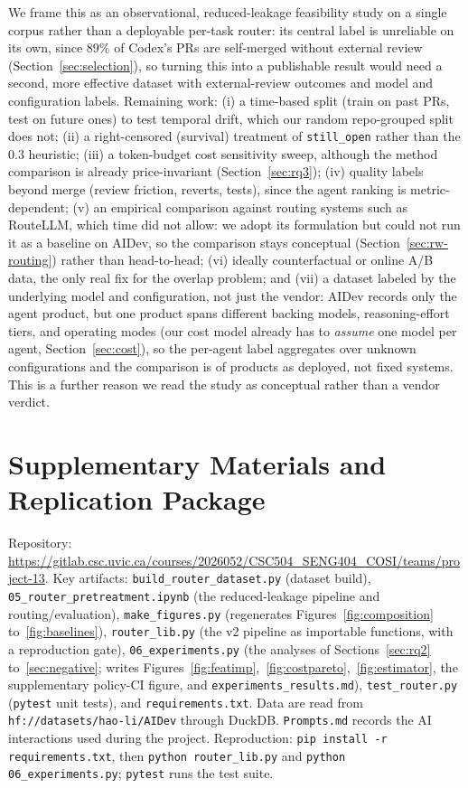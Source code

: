 \documentclass[sigconf,nonacm]{acmart}
\begin{document}
We frame this as an observational, reduced-leakage feasibility study on a single corpus rather than a deployable per-task router: its central label is unreliable on its own, since 89\% of Codex's PRs are self-merged without external review (Section~\ref{sec:selection}), so turning this into a publishable result would need a second, more effective dataset with external-review outcomes and model and configuration labels. Remaining work: (i) a time-based split (train on past PRs, test on future ones) to test temporal drift, which our random repo-grouped split does not; (ii) a right-censored (survival) treatment of \texttt{still\_open} rather than the 0.3 heuristic; (iii) a token-budget cost sensitivity sweep, although the method comparison is already price-invariant (Section~\ref{sec:rq3}); (iv) quality labels beyond merge (review friction, reverts, tests), since the agent ranking is metric-dependent; (v) an empirical comparison against routing systems such as RouteLLM, which time did not allow: we adopt its formulation but could not run it as a baseline on AIDev, so the comparison stays conceptual (Section~\ref{sec:rw-routing}) rather than head-to-head; (vi) ideally counterfactual or online A/B data, the only real fix for the overlap problem; and (vii) a dataset labeled by the underlying model and configuration, not just the vendor: AIDev records only the agent product, but one product spans different backing models, reasoning-effort tiers, and operating modes (our cost model already has to \emph{assume} one model per agent, Section~\ref{sec:cost}), so the per-agent label aggregates over unknown configurations and the comparison is of products as deployed, not fixed systems. This is a further reason we read the study as conceptual rather than a vendor verdict.




\appendix

\section{Supplementary Materials and Replication Package}

\sloppy
Repository: \url{https://gitlab.csc.uvic.ca/courses/2026052/CSC504_SENG404_COSI/teams/project-13}. Key artifacts: \texttt{build\_router\_dataset.py} (dataset build), \texttt{05\_router\_pretreatment.ipynb} (the reduced-leakage pipeline and routing/evaluation), \texttt{make\_figures.py} (regenerates Figures~\ref{fig:composition} to~\ref{fig:baselines}), \texttt{router\_lib.py} (the v2 pipeline as importable functions, with a reproduction gate), \texttt{06\_experiments.py} (the analyses of Sections~\ref{sec:rq2} to~\ref{sec:negative}; writes Figures~\ref{fig:featimp},~\ref{fig:costpareto},~\ref{fig:estimator}, the supplementary policy-CI figure, and \texttt{experiments\_results.md}), \texttt{test\_router.py} (\texttt{pytest} unit tests), and \texttt{requirements.txt}. Data are read from \texttt{hf://datasets/hao-li/AIDev} through DuckDB. \texttt{Prompts.md} records the AI interactions used during the project. Reproduction: \texttt{pip install -r requirements.txt}, then \texttt{python router\_lib.py} and \texttt{python 06\_experiments.py}; \texttt{pytest} runs the test suite.
\end{document}
